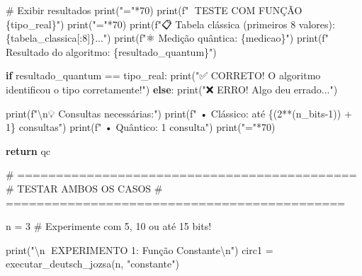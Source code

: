 \documentclass[
  brazilian,
]{report}
\newenvironment{Shaded}{\begin{snugshade}}{\end{snugshade}}
\newcommand{\BuiltInTok}[1]{\textcolor[rgb]{0.00,0.23,0.31}{#1}}
\newcommand{\CharTok}[1]{\textcolor[rgb]{0.13,0.47,0.30}{#1}}
\newcommand{\CommentTok}[1]{\textcolor[rgb]{0.37,0.37,0.37}{#1}}
\newcommand{\ControlFlowTok}[1]{\textcolor[rgb]{0.00,0.23,0.31}{\textbf{#1}}}
\newcommand{\DecValTok}[1]{\textcolor[rgb]{0.68,0.00,0.00}{#1}}
\newcommand{\NormalTok}[1]{\textcolor[rgb]{0.00,0.23,0.31}{#1}}
\newcommand{\OperatorTok}[1]{\textcolor[rgb]{0.37,0.37,0.37}{#1}}
\newcommand{\SpecialCharTok}[1]{\textcolor[rgb]{0.37,0.37,0.37}{#1}}
\newcommand{\SpecialStringTok}[1]{\textcolor[rgb]{0.13,0.47,0.30}{#1}}
\newcommand{\StringTok}[1]{\textcolor[rgb]{0.13,0.47,0.30}{#1}}
\begin{document}
\begin{tcolorbox}
\begin{Shaded}
\begin{Highlighting}[]
    \CommentTok{\# Exibir resultados}
    \BuiltInTok{print}\NormalTok{(}\StringTok{"="}\OperatorTok{*}\DecValTok{70}\NormalTok{)}
    \BuiltInTok{print}\NormalTok{(}\SpecialStringTok{f"🧪 TESTE COM FUNÇÃO }\SpecialCharTok{\{}\NormalTok{tipo\_real}\SpecialCharTok{\}}\SpecialStringTok{"}\NormalTok{)}
    \BuiltInTok{print}\NormalTok{(}\StringTok{"="}\OperatorTok{*}\DecValTok{70}\NormalTok{)}
    \BuiltInTok{print}\NormalTok{(}\SpecialStringTok{f"📋 Tabela clássica (primeiros 8 valores): }\SpecialCharTok{\{}\NormalTok{tabela\_classica[:}\DecValTok{8}\NormalTok{]}\SpecialCharTok{\}}\SpecialStringTok{..."}\NormalTok{)}
    \BuiltInTok{print}\NormalTok{(}\SpecialStringTok{f"⚛️  Medição quântica: }\SpecialCharTok{\{}\NormalTok{medicao}\SpecialCharTok{\}}\SpecialStringTok{"}\NormalTok{)}
    \BuiltInTok{print}\NormalTok{(}\SpecialStringTok{f"🎯 Resultado do algoritmo: }\SpecialCharTok{\{}\NormalTok{resultado\_quantum}\SpecialCharTok{\}}\SpecialStringTok{"}\NormalTok{)}
    
    \ControlFlowTok{if}\NormalTok{ resultado\_quantum }\OperatorTok{==}\NormalTok{ tipo\_real:}
        \BuiltInTok{print}\NormalTok{(}\StringTok{"✅ CORRETO! O algoritmo identificou o tipo corretamente!"}\NormalTok{)}
    \ControlFlowTok{else}\NormalTok{:}
        \BuiltInTok{print}\NormalTok{(}\StringTok{"❌ ERRO! Algo deu errado..."}\NormalTok{)}
    
    \BuiltInTok{print}\NormalTok{(}\SpecialStringTok{f"}\CharTok{\textbackslash{}n}\SpecialStringTok{💡 Consultas necessárias:"}\NormalTok{)}
    \BuiltInTok{print}\NormalTok{(}\SpecialStringTok{f"   • Clássico: até }\SpecialCharTok{\{}\NormalTok{(}\DecValTok{2}\OperatorTok{**}\NormalTok{(n\_bits}\OperatorTok{{-}}\DecValTok{1}\NormalTok{)) }\OperatorTok{+} \DecValTok{1}\SpecialCharTok{\}}\SpecialStringTok{ consultas"}\NormalTok{)}
    \BuiltInTok{print}\NormalTok{(}\SpecialStringTok{f"   • Quântico: 1 consulta"}\NormalTok{)}
    \BuiltInTok{print}\NormalTok{(}\StringTok{"="}\OperatorTok{*}\DecValTok{70}\NormalTok{)}
    
    \ControlFlowTok{return}\NormalTok{ qc}

\CommentTok{\# ============================================}
\CommentTok{\# TESTAR AMBOS OS CASOS}
\CommentTok{\# ============================================}

\NormalTok{n }\OperatorTok{=} \DecValTok{3}  \CommentTok{\# Experimente com 5, 10 ou até 15 bits!}

\BuiltInTok{print}\NormalTok{(}\StringTok{"}\CharTok{\textbackslash{}n}\StringTok{🔬 EXPERIMENTO 1: Função Constante}\CharTok{\textbackslash{}n}\StringTok{"}\NormalTok{)}
\NormalTok{circ1 }\OperatorTok{=}\NormalTok{ executar\_deutsch\_jozsa(n, }\StringTok{"constante"}\NormalTok{)}


\end{Highlighting}
\end{Shaded}
\end{tcolorbox}
\end{document}
